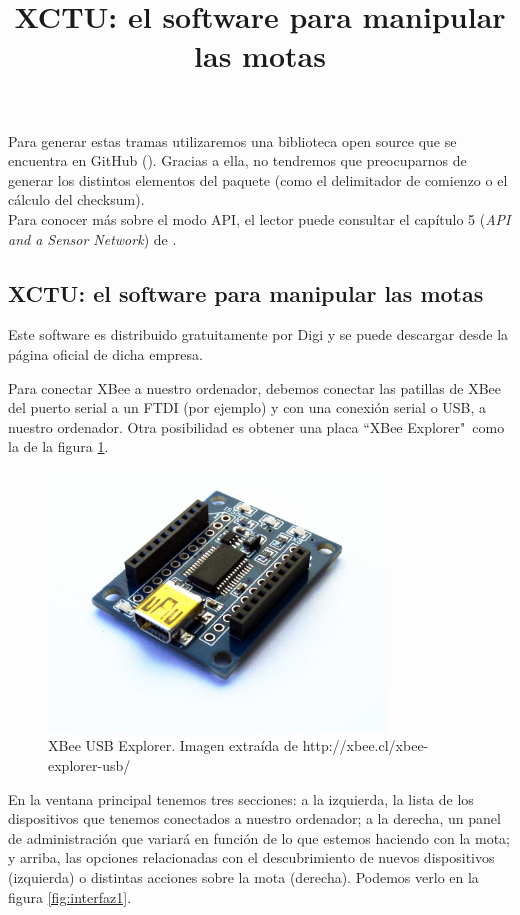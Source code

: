 Para generar estas tramas utilizaremos una biblioteca open source que se encuentra en GitHub (\cite{libraryArduinoXBee}).
Gracias a ella, no tendremos que preocuparnos de generar los distintos elementos del paquete
(como el delimitador de comienzo o el cálculo del checksum).\\

Para conocer más sobre el modo API, el lector puede consultar el capítulo 5 (\textit{API and a Sensor Network}) de \cite{faludi}.\\

\subsection{XCTU: el software para manipular las motas}
\title{XCTU: el software para manipular las motas}
\label{xctu}
Este software es distribuido gratuitamente por Digi \cite{licenciaXCTU} y se puede descargar desde la página oficial
de dicha empresa.

Para conectar XBee a nuestro ordenador, debemos conectar las patillas de XBee del puerto serial a un
FTDI (por ejemplo) y con una conexión serial o USB, a nuestro ordenador. Otra posibilidad es obtener
una placa ``XBee Explorer"\ como la de la figura \ref{fig:xbeeexplorer}.


\begin{figure}[htb]
\centering
\includegraphics[width=0.8\textwidth]{./imagenes/xbeeexplorer}
\caption{XBee USB Explorer. Imagen extraída de \scriptsize{http://xbee.cl/xbee-explorer-usb/}} \label{fig:xbeeexplorer}
\end{figure}


En la ventana principal tenemos tres secciones: a la izquierda, la lista de los dispositivos
que tenemos conectados a nuestro ordenador; a la derecha, un panel de administración que variará
en función de lo que estemos haciendo con la mota; y arriba, las opciones relacionadas con el descubrimiento
de nuevos dispositivos (izquierda) o distintas acciones sobre la mota (derecha). Podemos verlo en la figura \ref{fig:interfaz1}.\\

